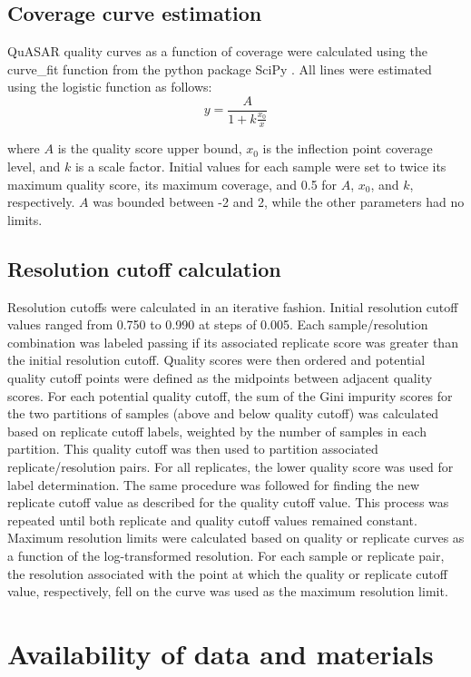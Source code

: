 \subsection{Coverage curve estimation}

QuASAR quality curves as a function of coverage were calculated using the curve\_fit function from the python package SciPy \cite{walt_numpy_2011}. All lines were estimated using the logistic function as follows:
\[y=\frac{A}{1+k\frac{x_0}{x}}\]

where $A$ is the quality score upper bound, $x_0$ is the inflection point coverage level, and $k$ is a scale factor. Initial values for each sample were set to twice its maximum quality score, its maximum coverage, and 0.5 for $A$, $x_0$, and $k$, respectively. $A$ was bounded between -2 and 2, while the other parameters had no limits.

\subsection{Resolution cutoff calculation}

Resolution cutoffs were calculated in an iterative fashion. Initial resolution cutoff values ranged from 0.750 to 0.990 at steps of 0.005. Each sample/resolution combination was labeled passing if its associated replicate score was greater than the initial resolution cutoff. Quality scores were then ordered and potential quality cutoff points were defined as the midpoints between adjacent quality scores. For each potential quality cutoff, the sum of the Gini impurity scores for the two partitions of samples (above and below quality cutoff) was calculated based on replicate cutoff labels, weighted by the number of samples in each partition. This quality cutoff was then used to partition associated replicate/resolution pairs. For all replicates, the lower quality score was used for label determination. The same procedure was followed for finding the new replicate cutoff value as described for the quality cutoff value. This process was repeated until both replicate and quality cutoff values remained constant. Maximum resolution limits were calculated based on quality or replicate curves as a function of the log-transformed resolution. For each sample or replicate pair, the resolution associated with the point at which the quality or replicate cutoff value, respectively, fell on the curve was used as the maximum resolution limit.

\section{Availability of data and materials}


